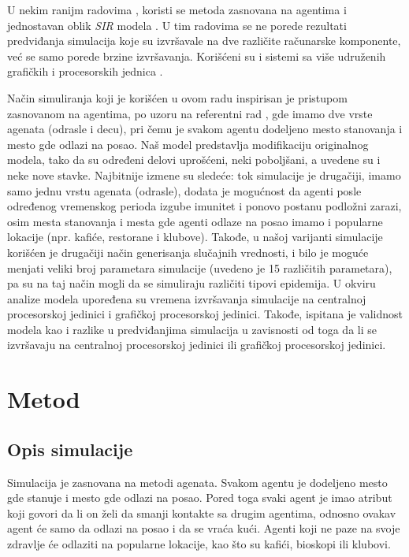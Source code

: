 U nekim ranijm radovima \parencite{shekh2015}, koristi se metoda zasnovana na agentima i jednostavan oblik \emph{SIR} modela \parencite{kovac2018}. U tim radovima se ne porede rezultati predviđanja simulacija koje su izvršavale na dve različite računarske komponente, već se samo porede brzine izvršavanja. Korišćeni su i sistemi sa više udruženih grafičkih i procesorskih jednica \parencites{aaby2010}{zou2013} .

Način simuliranja koji je korišćen u ovom radu inspirisan je pristupom zasnovanom na agentima, po uzoru na referentni rad \parencite{shekh2015}, gde imamo dve vrste agenata (odrasle i decu), pri čemu je svakom agentu dodeljeno mesto stanovanja i mesto gde odlazi na posao. Naš model predstavlja modifikaciju originalnog modela, tako da su određeni delovi uprošćeni, neki poboljšani, a uvedene su i neke nove stavke. Najbitnije izmene su sledeće: tok simulacije je drugačiji, imamo samo jednu vrstu agenata (odrasle), dodata je mogućnost da agenti posle određenog vremenskog perioda izgube imunitet i ponovo postanu podložni zarazi, osim mesta stanovanja i mesta gde agenti odlaze na posao imamo i popularne lokacije (npr. kafiće, restorane i klubove). Takođe, u našoj varijanti simulacije korišćen je drugačiji način generisanja slučajnih vrednosti, i bilo je moguće menjati veliki broj parametara simulacije (uvedeno je 15 različitih parametara), pa su na taj način mogli da se simuliraju različiti tipovi epidemija. U okviru analize modela upoređena su vremena izvršavanja simulacije na centralnoj procesorskoj jedinici i grafičkoj procesorskoj jedinici. Takođe, ispitana je validnost modela kao i razlike u predviđanjima simulacija u zavisnosti od toga da li se izvršavaju na centralnoj procesorskoj jedinici ili grafičkoj procesorskoj jedinici.

\section{Metod}

\subsection{Opis simulacije}

Simulacija je zasnovana na metodi agenata. Svakom agentu je dodeljeno mesto gde stanuje i mesto gde odlazi na posao. Pored toga svaki agent je imao atribut koji govori da li on želi da smanji kontakte sa drugim agentima, odnosno ovakav agent će samo da odlazi na posao i da se vraća kući. Agenti koji ne paze na svoje zdravlje će odlaziti na popularne lokacije, kao što su kafići, bioskopi ili klubovi.

